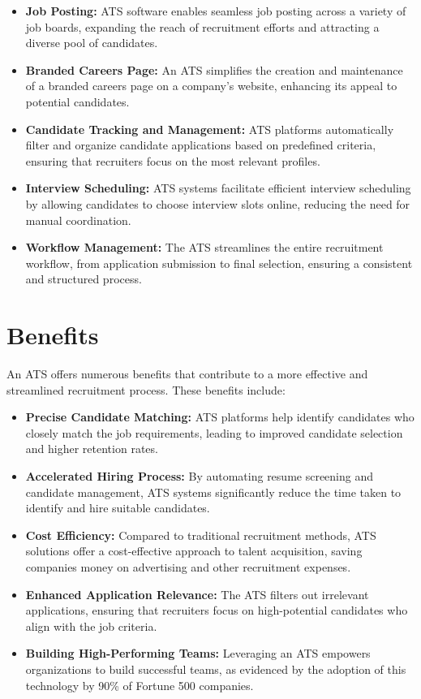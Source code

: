 \documentclass[
]{book}
\begin{document}
\begin{itemize}
\item
  \textbf{Job Posting:} ATS software enables seamless job posting across a variety of job boards, expanding the reach of recruitment efforts and attracting a diverse pool of candidates.
\item
  \textbf{Branded Careers Page:} An ATS simplifies the creation and maintenance of a branded careers page on a company's website, enhancing its appeal to potential candidates.
\item
  \textbf{Candidate Tracking and Management:} ATS platforms automatically filter and organize candidate applications based on predefined criteria, ensuring that recruiters focus on the most relevant profiles.
\item
  \textbf{Interview Scheduling:} ATS systems facilitate efficient interview scheduling by allowing candidates to choose interview slots online, reducing the need for manual coordination.
\item
  \textbf{Workflow Management:} The ATS streamlines the entire recruitment workflow, from application submission to final selection, ensuring a consistent and structured process.
\end{itemize}

\hypertarget{benefits}{%
\section{Benefits}\label{benefits}}

An ATS offers numerous benefits that contribute to a more effective and streamlined recruitment process. These benefits include:

\begin{itemize}
\item
  \textbf{Precise Candidate Matching:} ATS platforms help identify candidates who closely match the job requirements, leading to improved candidate selection and higher retention rates.
\item
  \textbf{Accelerated Hiring Process:} By automating resume screening and candidate management, ATS systems significantly reduce the time taken to identify and hire suitable candidates.
\item
  \textbf{Cost Efficiency:} Compared to traditional recruitment methods, ATS solutions offer a cost-effective approach to talent acquisition, saving companies money on advertising and other recruitment expenses.
\item
  \textbf{Enhanced Application Relevance:} The ATS filters out irrelevant applications, ensuring that recruiters focus on high-potential candidates who align with the job criteria.
\item
  \textbf{Building High-Performing Teams:} Leveraging an ATS empowers organizations to build successful teams, as evidenced by the adoption of this technology by 90\% of Fortune 500 companies.
\end{itemize}
\end{document}
